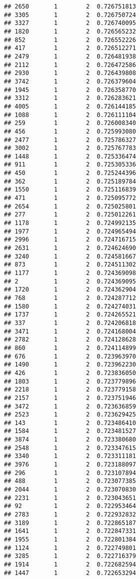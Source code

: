 \documentclass[
]{article}
\begin{document}
\begin{verbatim}
## 2650       1        2  0.726751813
## 3305       1        2  0.726750724
## 3327       1        2  0.726740095
## 1820       1        2  0.726565232
## 852        1        2  0.726552226
## 417        1        2  0.726512271
## 2479       1        2  0.726481938
## 2112       1        2  0.726472586
## 2930       1        2  0.726439808
## 3742       1        2  0.726379604
## 1945       1        2  0.726358770
## 3312       1        2  0.726283621
## 4005       1        2  0.726144185
## 1088       1        2  0.726111104
## 259        1        2  0.726008340
## 456        1        2  0.725993080
## 2477       1        2  0.725786327
## 3002       1        2  0.725767783
## 1448       1        2  0.725336474
## 911        1        2  0.725305336
## 450        1        2  0.725244396
## 362        1        2  0.725189784
## 1550       1        2  0.725116839
## 471        1        2  0.725095772
## 2654       1        2  0.725025801
## 277        1        2  0.725012261
## 1178       1        2  0.724992135
## 1977       1        2  0.724965494
## 2996       1        2  0.724716715
## 2631       1        2  0.724624690
## 3240       1        2  0.724581667
## 873        1        2  0.724511302
## 1177       1        2  0.724369098
## 2          1        2  0.724369095
## 1720       1        2  0.724362904
## 768        1        2  0.724287712
## 1580       1        2  0.724274031
## 1737       1        2  0.724265521
## 337        1        2  0.724206818
## 3471       1        2  0.724168004
## 2782       1        2  0.724128628
## 860        1        2  0.724114899
## 676        1        2  0.723963970
## 1490       1        2  0.723962230
## 426        1        2  0.723836050
## 1803       1        2  0.723779896
## 2218       1        2  0.723779158
## 2157       1        2  0.723751946
## 3472       1        2  0.723636859
## 2523       1        2  0.723629425
## 143        1        2  0.723486410
## 1584       1        2  0.723481527
## 3874       1        2  0.723380680
## 2548       1        2  0.723347615
## 3340       1        2  0.723311181
## 3976       1        2  0.723188097
## 296        1        2  0.723107894
## 488        1        2  0.723077385
## 2044       1        2  0.723070830
## 2231       1        2  0.723043651
## 92         1        2  0.722953464
## 2783       1        2  0.722932832
## 3189       1        2  0.722865187
## 1641       1        2  0.722847331
## 1955       1        2  0.722801384
## 1124       1        2  0.722749801
## 3285       1        2  0.722716379
## 1914       1        2  0.722682594
## 1447       1        2  0.722653294

\end{verbatim}
\end{document}
